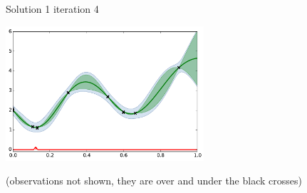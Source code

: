 \begin{frame}[noframenumbering]{Solution 1}
iteration 4
\begin{center}
\includegraphics[height=5cm]{4_optimization/figures/python/ego_EI1n4}
\end{center}
\tiny (observations not shown, they are over and under the black crosses)\\
\end{frame}




